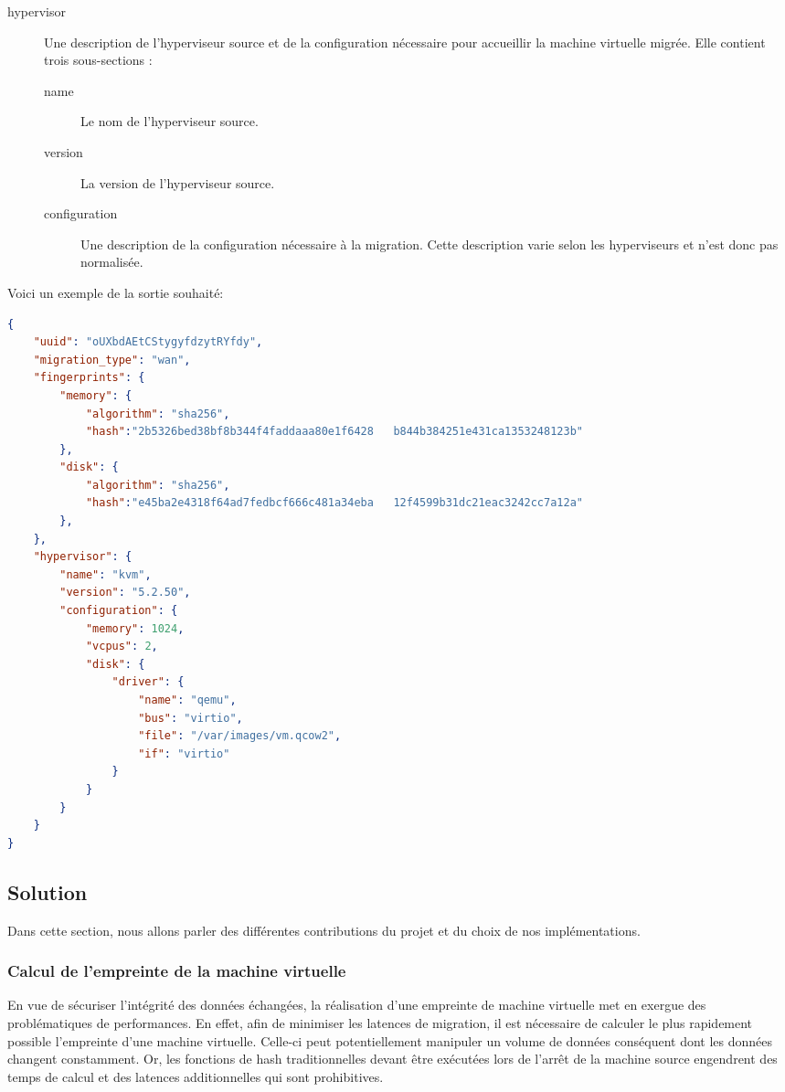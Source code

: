 \begin{description}
\begin{description}
    \end{description}

    \item[hypervisor] Une description de l’hyperviseur source et de la configuration nécessaire pour accueillir la machine virtuelle migrée.
    Elle contient trois sous-sections :

    \begin{description}
        \item[name] Le nom de l’hyperviseur source.
        \item[version] La version de l’hyperviseur source.
        \item[configuration] Une description de la configuration nécessaire à la migration. 
        Cette description varie selon les hyperviseurs et n’est donc pas normalisée.
    \end{description} 

\end{description}

Voici un exemple de la sortie souhaité:
\begin{lstlisting}[language=json,caption={Exemple de carte d'identité de migration},captionpos=b]
{
    "uuid": "oUXbdAEtCStygyfdzytRYfdy",
    "migration_type": "wan",
    "fingerprints": {
        "memory": {
            "algorithm": "sha256",
            "hash":"2b5326bed38bf8b344f4faddaaa80e1f6428   b844b384251e431ca1353248123b"
        },
        "disk": {
            "algorithm": "sha256",
            "hash":"e45ba2e4318f64ad7fedbcf666c481a34eba   12f4599b31dc21eac3242cc7a12a"
        },
    },
    "hypervisor": {
        "name": "kvm",
        "version": "5.2.50",
        "configuration": {
            "memory": 1024,
            "vcpus": 2,
            "disk": {
                "driver": {
                    "name": "qemu",
                    "bus": "virtio",
                    "file": "/var/images/vm.qcow2",
                    "if": "virtio"
                }
            }
        }
    }
}
\end{lstlisting}

\subsection{Solution}
Dans cette section, nous allons parler des différentes contributions du projet et du choix de nos implémentations.

\subsubsection{Calcul de l'empreinte de la machine virtuelle}
En vue de sécuriser l'intégrité des données échangées, la réalisation d'une empreinte de machine virtuelle met en exergue des problématiques de performances.
En effet, afin de minimiser les latences de migration, il est nécessaire de calculer le plus rapidement possible l’empreinte d’une machine virtuelle.
Celle-ci peut potentiellement manipuler un volume de données conséquent dont les données changent constamment.
Or, les fonctions de hash traditionnelles devant être exécutées lors de l'arrêt de la machine source engendrent des temps de calcul et des latences additionnelles qui sont prohibitives.\cite{usecase}

